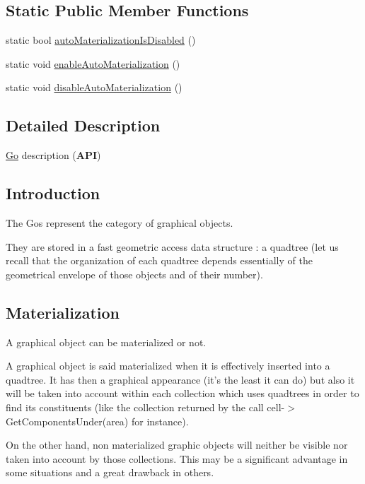 \subsection*{Static Public Member Functions}
\begin{DoxyCompactItemize}
\item 
static bool \hyperlink{classHurricane_1_1Go_a1057be4198a7b64c32a2ac3c7d560014}{auto\-Materialization\-Is\-Disabled} ()
\item 
static void \hyperlink{classHurricane_1_1Go_ab0b1ca3c606247e1ebd7cab8fa828b04}{enable\-Auto\-Materialization} ()
\item 
static void \hyperlink{classHurricane_1_1Go_a0d49d22a3788e8001e58152e62b9f3cc}{disable\-Auto\-Materialization} ()
\end{DoxyCompactItemize}


\subsection{Detailed Description}
\hyperlink{classHurricane_1_1Go}{Go} description ({\bfseries A\-P\-I}) 

\hypertarget{classHurricane_1_1Go_secGoIntro}{}\subsection{Introduction}\label{classHurricane_1_1Go_secGoIntro}
The Gos represent the category of graphical objects.

They are stored in a fast geometric access data structure \-: a quadtree (let us recall that the organization of each quadtree depends essentially of the geometrical envelope of those objects and of their number).\hypertarget{classHurricane_1_1Go_secGoMaterialization}{}\subsection{Materialization}\label{classHurricane_1_1Go_secGoMaterialization}
A graphical object can be materialized or not.

A graphical object is said materialized when it is effectively inserted into a quadtree. It has then a graphical appearance (it's the least it can do) but also it will be taken into account within each collection which uses quadtrees in order to find its constituents (like the collection returned by the call cell-\/$>$Get\-Components\-Under(area) for instance).

On the other hand, non materialized graphic objects will neither be visible nor taken into account by those collections. This may be a significant advantage in some situations and a great drawback in others.

